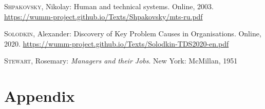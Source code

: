 \documentclass[a4paper,12pt]{article}
\begin{document}
\begin{thebibliography}{Gra21b}
 \textsc{Shpakovsky}, Nikolay: \newblock Human and 
  technical systems.  Online, 2003. \newblock
  \url{https://wumm-project.github.io/Texts/Shpakovsky/mts-ru.pdf}

 \textsc{Solodkin}, Alexander: \newblock Discovery of
  Key Problem Causes in Organisations.  Online, 2020.\newblock
  \url{https://wumm-project.github.io/Texts/Solodkin-TDS2020-en.pdf}

 \textsc{Stewart}, Rosemary: \newblock \emph{Managers
  and their Jobs}.  \newblock New York: McMillan, 1951

\end{thebibliography}

\clearpage

\section{Appendix}
\end{document}
